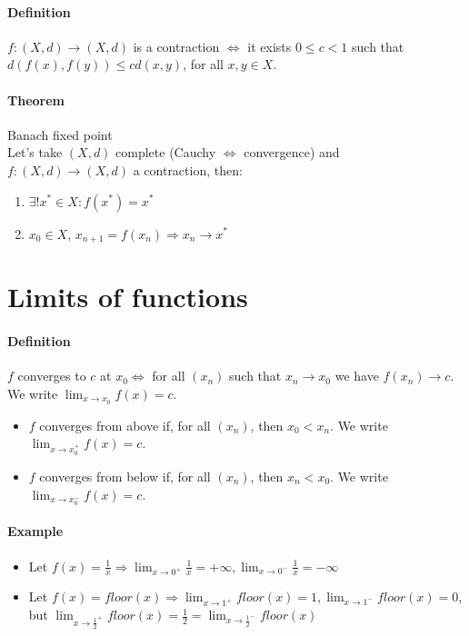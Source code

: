 \documentclass{article}
\newcommand{\DS}{\displaystyle}
\newcommand{\func}[3]{#1 : #2 \rightarrow #3}
\newcommand{\limx}[1]{\lim_{x \to #1}}
\newcommand{\Def}{\paragraph{Definition}}
\newcommand{\Theorem}{\paragraph{Theorem}}
\newcommand{\Example}{\paragraph{Example}}
\begin{document}
  \Def $\func{f}{(X,d)}{(X,d)}$ is a contraction $\iff$ it exists $0 \leq c < 1$
  such that $d(f(x),f(y)) \leq cd(x,y)$, for all $x,y \in X$.

  \Theorem Banach fixed point
\\Let's take $(X,d)$ complete (Cauchy $\iff$ convergence) and
  $\func{f}{(X,d)}{(X,d)}$ a contraction, then:
  \begin{enumerate}[label=(\roman*)]
    \item $\exists! x^* \in X : f(x^*) = x^*$
    \item $x_0 \in X$, $x_{n+1} = f(x_n) \Rightarrow x_n \to x^*$
  \end{enumerate}


\section{Limits of functions}

  \Def $f$ converges to $c$ at $x_0 \iff$ for all $(x_n)$ such that $x_n \to x_0$
  we have $f(x_n) \to c$. We write $\DS \limx{x_0} f(x) = c$.
  \begin{itemize}
    \item $f$ converges from above if, for all $(x_n)$, then $x_0 < x_n$.
    We write $\DS \limx{x_0^+} f(x) = c$.
    \item $f$ converges from below if, for all $(x_n)$, then $x_n < x_0$.
    We write $\DS \limx{x_0^-} f(x) = c$.
  \end{itemize}

  \Example
  \begin{itemize}
    \item Let $\DS f(x) = \frac{1}{x} \Rightarrow \limx{0^+} \frac{1}{x} =
    +\infty, \limx{0^-} \frac{1}{x} = -\infty$
    \item Let $\DS f(x) = floor(x) \Rightarrow \limx{1^+} floor(x) = 1,
    \limx{1^-} floor(x) = 0$, but $\DS \limx{\frac{1}{2}^+} floor(x) =
    \frac{1}{2} = \limx{\frac{1}{2}^-} floor(x)$
  \end{itemize}
\end{document}
